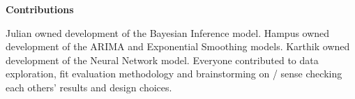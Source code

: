 \documentclass{article}
\begin{document}


\newpage
\large {\textbf{Contributions}}

Julian owned development of the Bayesian Inference model. Hampus owned development of the ARIMA and Exponential Smoothing models. Karthik owned development of the Neural Network model. Everyone contributed to data exploration, fit evaluation methodology and brainstorming on / sense checking each others' results and design choices.


\end{document}
